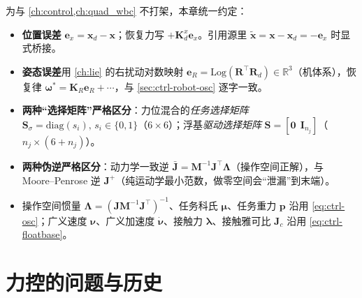 \begin{remark}
\label{rmk:force-wbc-notation}
为与 \cref{ch:control,ch:quad_wbc} 不打架，本章统一约定：
\begin{itemize}
  \item \textbf{位置误差} $\mathbf{e}_x=\mathbf{x}_d-\mathbf{x}$；恢复力写 $+\mathbf{K}_d^x\mathbf{e}_x$。引用源里 $\tilde{\mathbf{x}}=\mathbf{x}-\mathbf{x}_d=-\mathbf{e}_x$ 时显式桥接。
  \item \textbf{姿态误差}用 \cref{ch:lie} 的右扰动对数映射 $\mathbf{e}_R=\mathrm{Log}(\mathbf{R}^\top\mathbf{R}_d)\in\mathbb{R}^3$（机体系），恢复律 $\boldsymbol{\omega}^*=\mathbf{K}_R\mathbf{e}_R+\cdots$，与 \cref{sec:ctrl-robot-osc} 逐字一致。
  \item \textbf{两种“选择矩阵”严格区分}：力位混合的\emph{任务选择矩阵} $\mathbf{S}_\sigma=\mathrm{diag}(s_i),\,s_i\in\{0,1\}$（$6\times6$）；浮基\emph{驱动选择矩阵} $\mathbf{S}=[\mathbf{0}\ \ \mathbf{I}_{n_j}]$（$n_j\times(6+n_j)$）。
  \item \textbf{两种伪逆严格区分}：动力学一致逆 $\bar{\mathbf{J}}=\mathbf{M}^{-1}\mathbf{J}^\top\boldsymbol{\Lambda}$（操作空间正解），与 Moore--Penrose 逆 $\mathbf{J}^+$（纯运动学最小范数，做零空间会“泄漏”到末端）。
  \item 操作空间惯量 $\boldsymbol{\Lambda}=(\mathbf{J}\mathbf{M}^{-1}\mathbf{J}^\top)^{-1}$、任务科氏 $\boldsymbol{\mu}$、任务重力 $\mathbf{p}$ 沿用 \cref{eq:ctrl-osc}；广义速度 $\boldsymbol{\nu}$、广义加速度 $\dot{\boldsymbol{\nu}}$、接触力 $\boldsymbol{\lambda}$、接触雅可比 $\mathbf{J}_c$ 沿用 \cref{eq:ctrl-floatbase}。
\end{itemize}
\end{remark}

\section{力控的问题与历史}
\label{sec:fw-history}

